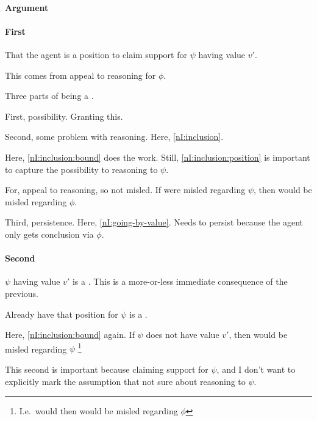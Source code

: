 \paragraph{Argument}


\paragraph{First \requ{}}

\begin{note}
  That the agent is a position to claim support for \(\psi\) having value \(v'\).

  This comes from appeal to reasoning for \(\phi\).

  Three parts of being a \requ{}.

  First, possibility.
  Granting this.

  Second, some problem with reasoning.
  Here, \autoref{nI:inclusion}.


  Here, \autoref{nI:inclusion:bound} does the work.
  Still, \autoref{nI:inclusion:position} is important to capture the possibility to reasoning to \(\psi\).

  For, appeal to reasoning, so not misled.
  If were misled regarding \(\psi\), then would be misled regarding \(\phi\).

  Third, persistence.
  Here, \autoref{nI:going-by-value}.
  Needs to persist because the agent only gets conclusion via \(\phi\).
\end{note}

\paragraph{Second \requ{}}

\begin{note}
  \(\psi\) having value \(v'\) is a \requ{}.
  This is a more-or-less immediate consequence of the previous.

  Already have that position for \(\psi\) is a \requ{}.

  Here, \autoref{nI:inclusion:bound} again.
  If \(\psi\) does not have value \(v'\), then would be misled regarding \(\psi\)\nolinebreak
  \footnote{I.e.\ would then would be misled regarding \(\phi\)}

  {
    \color{red} This second \requ{} is important because claiming support for \(\psi\), and I don't want to explicitly mark the assumption that not sure about reasoning to \(\psi\).
  }
\end{note}

